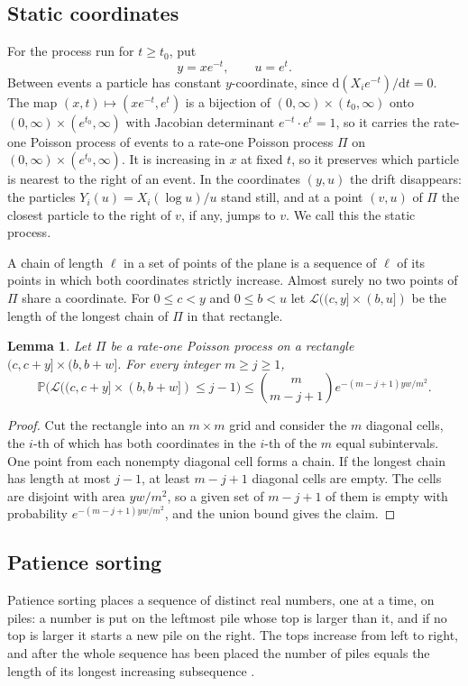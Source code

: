 \documentclass[11pt]{amsart}
\newtheorem{lemma}[theorem]{Lemma}
\theoremstyle{remark}
\numberwithin{equation}{section}
\newcommand{\Pp}{\mathbb P}
\begin{document}
\subsection{Static coordinates}
For the process run for $t\ge t_0$, put
\[
y=x e^{-t},\qquad u=e^{t}.
\]
Between events a particle has constant $y$-coordinate, since $\mathrm d(X_ie^{-t})/\mathrm dt=0$. The map $(x,t)\mapsto(xe^{-t},e^t)$ is a bijection of $(0,\infty)\times(t_0,\infty)$ onto $(0,\infty)\times(e^{t_0},\infty)$ with Jacobian determinant $e^{-t}\cdot e^{t}=1$, so it carries the rate-one Poisson process of events to a rate-one Poisson process $\Pi$ on $(0,\infty)\times(e^{t_0},\infty)$. It is increasing in $x$ at fixed $t$, so it preserves which particle is nearest to the right of an event. In the coordinates $(y,u)$ the drift disappears: the particles $Y_i(u)=X_i(\log u)/u$ stand still, and at a point $(v,u)$ of $\Pi$ the closest particle to the right of $v$, if any, jumps to $v$. We call this the static process.

A chain of length $\ell$ in a set of points of the plane is a sequence of $\ell$ of its points in which both coordinates strictly increase. Almost surely no two points of $\Pi$ share a coordinate. For $0\le c<y$ and $0\le b<u$ let $\mathcal L((c,y]\times(b,u])$ be the length of the longest chain of $\Pi$ in that rectangle.

\begin{lemma}\label{lem:cells}
Let $\Pi$ be a rate-one Poisson process on a rectangle $(c,c+y]\times(b,b+w]$. For every integer $m\ge j\ge1$,
\[
\Pp\bigl(\mathcal L((c,c+y]\times(b,b+w])\le j-1\bigr)\le\binom{m}{m-j+1}e^{-(m-j+1)yw/m^2}.
\]
\end{lemma}

\begin{proof}
Cut the rectangle into an $m\times m$ grid and consider the $m$ diagonal cells, the $i$-th of which has both coordinates in the $i$-th of the $m$ equal subintervals. One point from each nonempty diagonal cell forms a chain. If the longest chain has length at most $j-1$, at least $m-j+1$ diagonal cells are empty. The cells are disjoint with area $yw/m^2$, so a given set of $m-j+1$ of them is empty with probability $e^{-(m-j+1)yw/m^2}$, and the union bound gives the claim.
\end{proof}

\subsection{Patience sorting}
Patience sorting \cite{AD99} places a sequence of distinct real numbers, one at a time, on piles: a number is put on the leftmost pile whose top is larger than it, and if no top is larger it starts a new pile on the right. The tops increase from left to right, and after the whole sequence has been placed the number of piles equals the length of its longest increasing subsequence \cite[Lemma~1]{AD99}.
\end{document}
